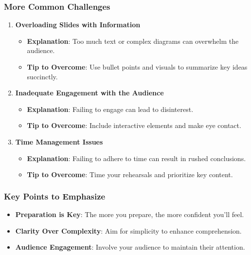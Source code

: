 \documentclass{beamer}
\begin{document}
\begin{frame}[fragile]
    \frametitle{More Common Challenges}
    \begin{enumerate}[resume]
        \item \textbf{Overloading Slides with Information}
            \begin{itemize}
                \item \textbf{Explanation}: Too much text or complex diagrams can overwhelm the audience.
                \item \textbf{Tip to Overcome}: Use bullet points and visuals to summarize key ideas succinctly.
            \end{itemize}

        \item \textbf{Inadequate Engagement with the Audience}
            \begin{itemize}
                \item \textbf{Explanation}: Failing to engage can lead to disinterest.
                \item \textbf{Tip to Overcome}: Include interactive elements and make eye contact.
            \end{itemize}

        \item \textbf{Time Management Issues}
            \begin{itemize}
                \item \textbf{Explanation}: Failing to adhere to time can result in rushed conclusions.
                \item \textbf{Tip to Overcome}: Time your rehearsals and prioritize key content.
            \end{itemize}
    \end{enumerate}
\end{frame}

\begin{frame}[fragile]
    \frametitle{Key Points to Emphasize}
    \begin{itemize}
        \item \textbf{Preparation is Key}: The more you prepare, the more confident you'll feel.
        \item \textbf{Clarity Over Complexity}: Aim for simplicity to enhance comprehension.
        \item \textbf{Audience Engagement}: Involve your audience to maintain their attention.
    \end{itemize}
\end{frame}
\end{document}
